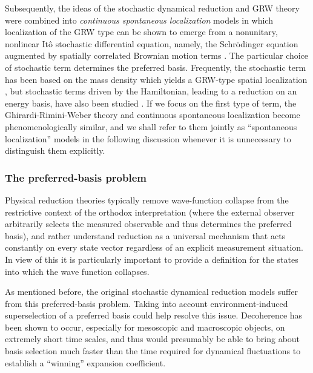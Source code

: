 \documentclass[twocolumn,rmp,aps,amsmath,amsfonts,noshowkeys,noshowpacs]{revtex4}
\begin{document}
Subsequently, the ideas of the stochastic dynamical reduction and GRW
theory were combined into {\em continuous spontaneous localization}
models \cite{Pearle:1989:cs,Ghirardi:1990:lm} in which localization of
the GRW type can be shown to emerge from a nonunitary, nonlinear It\^o
stochastic differential equation, namely, the Schr\"odinger equation
augmented by spatially correlated Brownian motion terms \citep[see
also][]{Diosi:1988:wx,Diosi:1989:yb}. The particular choice of 
stochastic term determines the preferred basis. Frequently, the
stochastic term has been based on the mass density which yields a
GRW-type spatial localization
\citep{Diosi:1989:yb,Pearle:1989:cs,Ghirardi:1990:lm}, but stochastic
terms driven by the Hamiltonian, leading to a reduction on an energy
basis, have also been studied
\citep{Bedford:1975:un,Bedford:1977:un,Milburn:1991:tv,Percival:1995:om,%
Percival:1998:om,Hughston:1996:in,Fivel:1997:ia,%
Adler:2002:rc,Adler:2001:tr,Adler:2000:gv}.  If we focus on the first
type of term, the Ghirardi-Rimini-Weber theory and continuous
spontaneous localization become phenomenologically similar, and we
shall refer to them jointly as ``spontaneous localization'' models in
the following discussion whenever it is unnecessary to distinguish
them explicitly.


\subsubsection{The preferred-basis problem}
  
Physical reduction theories typically remove wave-function collapse
from the restrictive context of the orthodox interpretation (where the
external observer arbitrarily selects the measured observable and thus
determines the preferred basis), and rather understand reduction as a
universal mechanism that acts constantly on every state vector
regardless of an explicit measurement situation. In view of this it is
particularly important to provide a definition for the states into
which the wave function collapses.

As mentioned before, the original stochastic dynamical reduction
models suffer from this preferred-basis problem. Taking into account
environment-induced superselection of a preferred basis could help
resolve this issue.  Decoherence has been shown to occur, especially
for mesoscopic and macroscopic objects, on extremely short time
scales, and thus would presumably be able to bring about basis
selection much faster than the time required for dynamical
fluctuations to establish a ``winning'' expansion coefficient.
\end{document}
